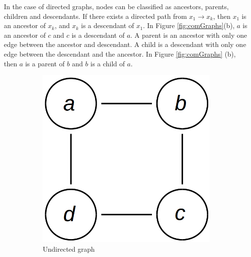 \documentclass[12pt,oneside,openany,a4paper, %
afrikaans,english,
]{memoir}
\numberwithin{equation}{chapter}
\begin{document}
In the case of directed graphs, nodes can be classified as ancestors, parents, children and descendants. If there exists a directed path from $x_1 \to x_k$, then $x_1$ is an ancestor of $x_k$, and $x_k$ is a descendant of $x_1$. In Figure \ref{fig:comGraphs}(b), $a$ is an ancestor of $c$ and $c$ is a descendant of $a$. A parent is an ancestor with only one edge between the ancestor and descendant. A child is a descendant with only one edge between the descendant and the ancestor. In Figure \ref{fig:comGraphs} (b), then $a$ is a parent of $b$ and $b$ is a child of $a$.~\cite{barber}
\begin{figure}[h!]
  \centering
  \begin{subfigure}[b]{0.25\linewidth}
    \includegraphics[width=\linewidth]{Figures/undirected_graph.png}
    \caption{Undirected graph}
  \end{subfigure}
  \begin{subfigure}[b]{0.25\linewidth}

\end{subfigure}
\end{figure}
\end{document}
